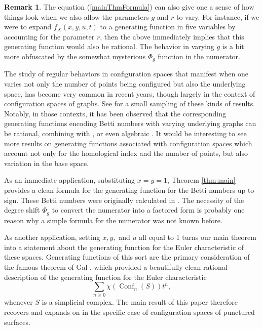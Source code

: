 \documentclass[11pt,reqno]{amsproc}
\numberwithin{equation}{section}
\theoremstyle{definition}
\newtheorem{remark}[theorem]{Remark}
\theoremstyle{remark}
\DeclareMathOperator{\Conf}{Conf}
\begin{document}
\begin{remark}
The equation (\ref{mainThmFormula}) can also give one a sense of how things look when we also allow the parameters $g$ and $r$ to vary. For instance, if we were to expand $f_X(x,y,u,t)$ to a generating function in five variables by accounting for the parameter $r$, then the above immediately implies that this generating function would also be rational. The behavior in varying $g$ is a bit more obfuscated by the somewhat mysterious $\Phi_g$ function in the numerator.

The study of regular behaviors in configuration spaces that manifest when one varies not only the number of points being configured but also the underlying space, has become very common in recent years, though largely in the context of configuration spaces of graphs. See \cite{lutgehetmann2017representation,miyata2023graph,ramos2020application,knudsen2024robertson} for a small sampling of these kinds of results. Notably, in those contexts, it has been observed that the corresponding generating functions encoding Betti numbers with varying underlying graphs can be rational, combining \cite{ramos2020application} with \cite{nagel2021rationality}, or even algebraic \cite{ramos2021hilbert}. It would be interesting to see more results on generating functions associated with configuration spaces which account not only for the homological index and the number of points, but also variation in the base space.
\end{remark}

As an immediate application, substituting $x=y=1$, Theorem \ref{thm:main} provides a clean formula for the generating function for the Betti numbers up to sign. These Betti numbers were originally calculated in \cite{drummondcoleknudsen}. The necessity of the degree shift $\Phi_g$ to convert the numerator into a factored form is probably one reason why a simple formula for the numerator was not known before. 

As another application, setting $x,y,$ and $u$ all equal to 1 turns our main theorem into a statement about the generating function for the Euler characteristic of these spaces. Generating functions of this sort are the primary consideration of the famous theorem of Gal \cite{Gal}, which provided a beautifully clean rational description of the generating function for the Euler characteristic
\[
\sum_{n \geq 0} \chi(\Conf_n(S))t^n,
\]
whenever $S$ is a simplicial complex. The main result of this paper therefore recovers and expands on \cite{Gal} in the specific case of configuration spaces of punctured surfaces.
\end{document}
